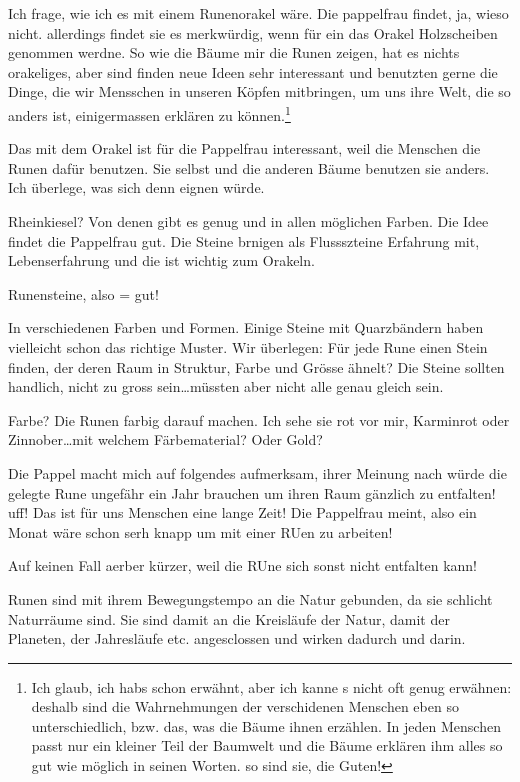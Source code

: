 \documentclass[11pt,titlepage,a5paper]{book}
\begin{document}
Ich frage, wie ich es mit einem Runenorakel wäre. Die pappelfrau findet, ja, wieso nicht. allerdings findet sie es merkwürdig, wenn für ein das Orakel Holzscheiben genommen werdne. So wie die Bäume mir die Runen zeigen, hat es nichts orakeliges, aber sind finden neue Ideen sehr interessant und benutzten gerne die Dinge, die wir Mensschen in unseren Köpfen mitbringen, um uns ihre Welt, die so anders ist, einigermassen erklären zu können.\footnote{Ich glaub, ich habs schon erwähnt, aber ich kanne s nicht oft genug erwähnen: deshalb sind die Wahrnehmungen der verschidenen Menschen eben so unterschiedlich, bzw. das, was die Bäume ihnen erzählen. In jeden Menschen passt nur ein kleiner Teil der Baumwelt und die Bäume erklären ihm alles so gut wie möglich in seinen Worten. so sind sie, die Guten!}

Das  mit dem Orakel ist für die Pappelfrau interessant, weil die Menschen die Runen dafür benutzen. Sie selbst und die anderen Bäume benutzen sie anders. Ich überlege, was sich denn eignen würde. 

Rheinkiesel? Von denen gibt es genug und in allen möglichen Farben. Die Idee findet die Pappelfrau gut. Die Steine brnigen als Flussszteine Erfahrung mit, Lebenserfahrung und die ist wichtig zum Orakeln. 

Runensteine, also = gut!

In verschiedenen Farben und Formen. Einige Steine mit Quarzbändern haben vielleicht schon das richtige Muster. Wir überlegen: Für jede Rune einen Stein finden, der deren Raum in Struktur, Farbe und Grösse ähnelt? Die Steine sollten handlich, nicht zu gross sein\dots müssten aber nicht alle genau gleich sein.

Farbe? Die Runen farbig darauf machen. Ich sehe sie rot vor mir, Karminrot oder Zinnober\dots mit welchem Färbematerial? Oder Gold?

Die Pappel macht mich auf folgendes aufmerksam, ihrer Meinung nach würde die gelegte Rune ungefähr ein Jahr brauchen um ihren Raum gänzlich zu entfalten! uff! Das ist für uns Menschen eine lange Zeit! Die Pappelfrau meint, also ein Monat wäre schon serh knapp um mit einer RUen zu arbeiten!

Auf keinen Fall aerber kürzer, weil die RUne sich sonst nicht entfalten kann!

Runen sind mit ihrem Bewegungstempo an die Natur gebunden, da sie schlicht Naturräume sind. Sie sind damit an die Kreisläufe der Natur, damit der Planeten, der Jahresläufe etc. angesclossen und wirken dadurch und darin.
\end{document}
